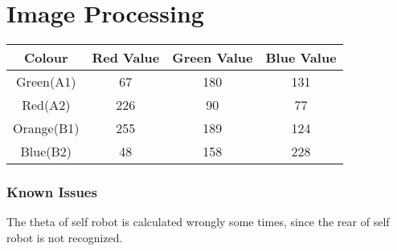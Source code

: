 \chapter{Image Processing}
\label{cha:IP}

\begin{table}[h]\small
    \begin{tabular}{c|ccc}
    \hline 
    Colour&Red Value&Green Value&Blue Value\\
    \hline 
    Green(A1)&67&180&131\\
    Red(A2)&226&90&77\\
    Orange(B1)&255&189&124\\
    Blue(B2)&48&158&228\\
    \hline 
    \end{tabular}
    \end{table}

\subsection{Known Issues}
The theta of self robot is calculated wrongly some times, since the rear of self robot is not recognized.
